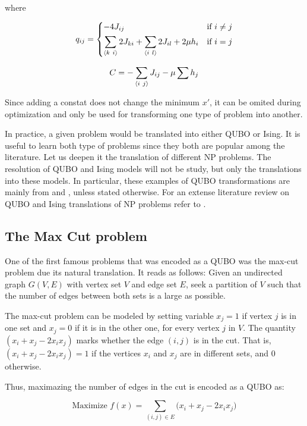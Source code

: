 where 

\begin{equation*}
	q_{ij} = 
		\begin{dcases}
			-4 J_{ij} 																	& \text{if } i \neq j \\
			\sum_{\langle k ~ i \rangle} 2 J_{ki} + \sum_{\langle i ~ l \rangle} 2 J_{il} + 2 \mu h_i	& \text{if } i = j
		\end{dcases}
\end{equation*}

$$ C = - \sum_{\langle i ~ j \rangle} J_{ij} - \mu \sum h_j $$

Since adding a constat does not change the minimum $x'$, it can be omited during optimization and only be used for transforming one type of problem into another.

In practice, a given problem would be translated into either QUBO or Ising. It is useful to learn both type of problems since they both are popular among the literature. Let us deepen it the translation of different NP problems. The resolution of QUBO and Ising models will not be study, but only the translations into these models. In particular, these examples of QUBO transformations are mainly from \cite{Glover2019} and \cite{Lucas2014}, unless stated otherwise. For an extense literature review on QUBO and Ising translations of NP problems refer to \cite{Kochenberger2014}.


\subsection{The Max Cut problem}


One of the first famous problems that was encoded as a QUBO was the max-cut problem due its natural translation. It reads as follows: Given an undirected graph $G(V, E)$ with vertex set $V$ and edge set $E$, seek a partition of $V$ such that the number of edges between both sets is a large as possible.

The max-cut problem can be modeled by setting variable $x_j = 1$ if vertex $j$ is in one set and $x_j = 0$ if it is in the other one, for every vertex $j$ in $V$. The quantity $(x_i + x_j - 2 x_i x_j)$ marks whether the edge $(i,j)$ is in the cut. That is, $(x_i + x_j - 2 x_i x_j) = 1$ if the vertices $x_i$ and $x_j$ are in different sets, and $0$ otherwise.

Thus, maximazing the number of edges in the cut is encoded as a QUBO as:

$$ \text{Maximize } f(x) = \sum_{(i,j) \in E} \big( x_i + x_j - 2 x_i x_j \big) $$


